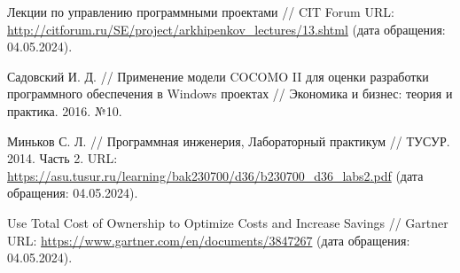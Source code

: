 \begin{thebibliography}{99\kern\bibindent}
	 Лекции по управлению программными проектами // CIT Forum URL: \url{http://citforum.ru/SE/project/arkhipenkov_lectures/13.shtml} (дата обращения: 04.05.2024).

	 Садовский И. Д. // Применение модели COCOMO II для оценки разработки программного обеспечения в Windows проектах // Экономика и бизнес: теория и практика. 2016. №10. %

	 Миньков С. Л. // Программная инженерия, Лабораторный практикум // ТУСУР. 2014. Часть 2. URL: \url{https://asu.tusur.ru/learning/bak230700/d36/b230700_d36_labs2.pdf} (дата обращения: 04.05.2024).

	 Use Total Cost of Ownership to Optimize Costs and Increase Savings // Gartner URL: \url{https://www.gartner.com/en/documents/3847267} (дата обращения: 04.05.2024).

\end{thebibliography}